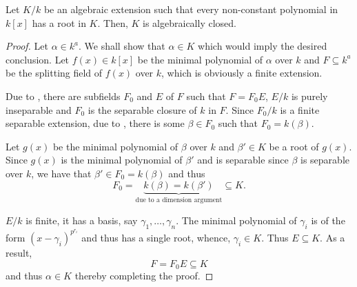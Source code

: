 \begin{theorem}
    Let $K/k$ be an algebraic extension such that every non-constant polynomial in $k[x]$ has a root in $K$. Then, $K$ is algebraically closed.
\end{theorem}
\begin{proof}
    Let $\alpha\in k^a$. We shall show that $\alpha\in K$ which would imply the desired conclusion. Let $f(x)\in k[x]$ be the minimal polynomial of $\alpha$ over $k$ and $F\subseteq k^a$ be the splitting field of $f(x)$ over $k$, which is obviously a finite extension.

    Due to , there are subfields $F_0$ and $E$ of $F$ such that $F = F_0E$, $E/k$ is purely inseparable and $F_0$ is the separable closure of $k$ in $F$. Since $F_0/k$ is a finite separable extension, due to , there is some $\beta\in F_0$ such that $F_0 = k(\beta)$. 

    Let $g(x)$ be the minimal polynomial of $\beta$ over $k$ and $\beta'\in K$ be a root of $g(x)$. Since $g(x)$ is the minimal polynomial of $\beta'$ and is separable since $\beta$ is separable over $k$, we have that $\beta'\in F_0 = k(\beta)$ and thus 
    \begin{equation*}
        F_0 = \underbrace{k(\beta) = k(\beta')}_{\text{due to a dimension argument}}\subseteq K.
    \end{equation*}

    $E/k$ is finite, it has a basis, say $\gamma_1,\dots,\gamma_n$. The minimal polynomial of $\gamma_i$ is of the form $(x - \gamma_i)^{p^{r_i}}$ and thus has a single root, whence, $\gamma_i\in K$. Thus $E\subseteq K$. As a result, 
    \begin{equation*}
        F = F_0E\subseteq K
    \end{equation*}
    and thus $\alpha\in K$ thereby completing the proof.
\end{proof}
